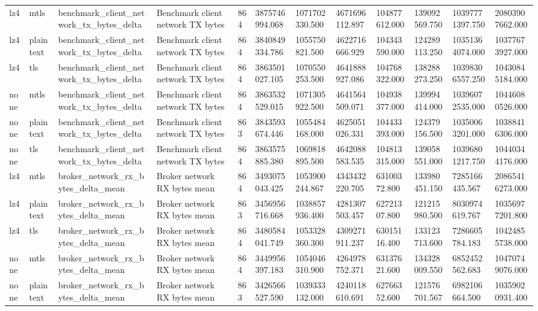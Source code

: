 \begin{longtable}{llllllllllll}
lz4 & mtls & benchmark\_client\_network\_tx\_bytes\_delta & Benchmark client network TX bytes & 864 & 3875746994.068 & 1071702330.500 & 4671696112.897 & 104877612.000 & 139092569.750 & 10397771397.750 & 20803907662.000 \\
lz4 & plaintext & benchmark\_client\_network\_tx\_bytes\_delta & Benchmark client network TX bytes & 864 & 3840849334.786 & 1055750821.500 & 4622716666.929 & 104343590.000 & 124289113.250 & 10351364074.000 & 10377673927.000 \\
lz4 & tls & benchmark\_client\_network\_tx\_bytes\_delta & Benchmark client network TX bytes & 864 & 3863501027.105 & 1070550253.500 & 4641888927.086 & 104768322.000 & 138288273.250 & 10398306557.250 & 10430845184.000 \\
none & mtls & benchmark\_client\_network\_tx\_bytes\_delta & Benchmark client network TX bytes & 864 & 3863532529.015 & 1071305922.500 & 4641564509.071 & 104938377.000 & 139994414.000 & 10396072535.000 & 10446080526.000 \\
none & plaintext & benchmark\_client\_network\_tx\_bytes\_delta & Benchmark client network TX bytes & 863 & 3843593674.446 & 1055484168.000 & 4625051026.331 & 104433393.000 & 124379156.500 & 10350063201.000 & 10388416306.000 \\
none & tls & benchmark\_client\_network\_tx\_bytes\_delta & Benchmark client network TX bytes & 864 & 3863575885.380 & 1069818895.500 & 4642088583.535 & 104813315.000 & 139058551.000 & 10396801217.750 & 10440344176.000 \\
lz4 & mtls & broker\_network\_rx\_bytes\_delta\_mean & Broker network RX bytes mean & 864 & 3493075043.425 & 1053900244.867 & 4343432220.705 & 63100372.800 & 133980451.150 & 7285166435.567 & 20865416273.000 \\
lz4 & plaintext & broker\_network\_rx\_bytes\_delta\_mean & Broker network RX bytes mean & 863 & 3456956716.668 & 1038857936.400 & 4281307503.457 & 62721307.800 & 121215980.500 & 8030974619.767 & 10356977201.800 \\
lz4 & tls & broker\_network\_rx\_bytes\_delta\_mean & Broker network RX bytes mean & 864 & 3480584041.749 & 1053328360.300 & 4309271911.237 & 63015116.400 & 133123713.600 & 7286605784.183 & 10424855738.000 \\
none & mtls & broker\_network\_rx\_bytes\_delta\_mean & Broker network RX bytes mean & 864 & 3449956397.183 & 1054046310.900 & 4264978752.371 & 63137621.600 & 134328009.550 & 6852452562.683 & 10470749076.000 \\
none & plaintext & broker\_network\_rx\_bytes\_delta\_mean & Broker network RX bytes mean & 863 & 3426566527.590 & 1039333132.000 & 4240118610.691 & 62766352.600 & 121576701.567 & 6982106664.500 & 10359020931.400 \\

\end{longtable}
